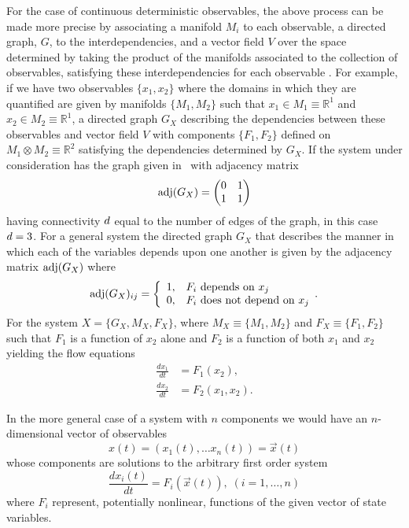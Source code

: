 For the case of continuous deterministic observables, the above process can be made more precise by associating a manifold $M_i$ to each observable, a directed graph, $G$, to the interdependencies, and a vector field $V$ over the space determined by taking the product of the manifolds associated to the collection of observables, satisfying these interdependencies for each observable  \cite{Deville}. For example, if we have two observables $\{x_1,x_2\}$ where the domains in which they are quantified are given by manifolds $\{M_1,M_2\}$ such that $x_1 \in M_1 \equiv \mathbb{R}^1$ and $x_2 \in M_2 \equiv \mathbb{R}^1$, a directed graph $G_X$ describing the dependencies between these observables and vector field $V$ with components $\{F_1,F_2\}$ defined on $M_1 \otimes M_2 \equiv \mathbb{R}^2$ satisfying the dependencies determined by $G_X$. If the system under consideration has the graph given in $\,$
% 
with adjacency matrix
$$
\mathrm{adj}(G_X) = \begin{pmatrix}
0 & 1 \\
1 & 1
\end{pmatrix}
$$
having connectivity $d$ equal to the number of edges of the graph, in this case $d = 3$. For a general system the directed graph $G_X$ that describes the manner in which each of the variables depends upon one another is given by the adjacency matrix $\mathrm{adj}(G_X)$ where
 \begin{displaymath}
   \mathrm{adj}(G_X)_{ij} = \left\{
     \begin{array}{ll}
       1, & F_i \hbox{ depends on } x_j\\
       0, & F_i \hbox{ does not depend on } x_j
     \end{array}.
   \right.
\end{displaymath} For the system $X = \{G_X, M_X, F_X\}$, where $M_X \equiv \{M_1,M_2\}$ and $F_X \equiv \{F_1,F_2\}$ such that $F_1$ is a function of $x_2$ alone and $F_2$ is a function of both $x_1$ and $x_2$ yielding the flow equations
\begin{align*}
\frac{dx_1}{dt} & = F_1(x_2),\\
\frac{dx_2}{dt} & = F_2(x_1,x_2).
\end{align*}

In the more general case of a system with $n$ components we would have an $n$-dimensional vector of observables
$$
x(t) = (x_1(t), \ldots x_n(t)) = \vec{x}(t)
$$
whose components are solutions to the arbitrary first order system
$$
\frac{dx_i(t)}{dt} = F_i(\vec{x}(t)), \; (i=1,\ldots,n)
$$
where $F_i$ represent, potentially nonlinear, functions of the given vector of state variables.

